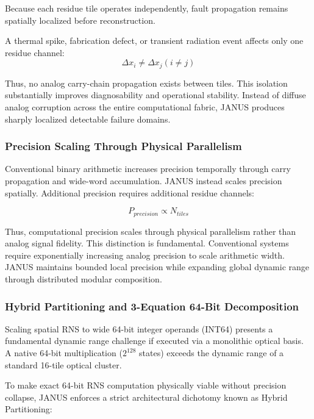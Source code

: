 \documentclass[journal]{IEEEtran}
\begin{document}
Because each residue tile operates independently, fault propagation remains spatially localized before reconstruction.

A thermal spike, fabrication defect, or transient radiation event affects only one residue channel:
\begin{equation}
\Delta x_i \neq  \Delta x_j (i \neq  j)
\end{equation}

Thus, no analog carry-chain propagation exists between tiles. This isolation substantially improves diagnosability and operational stability. Instead of diffuse analog corruption across the entire computational fabric, JANUS produces sharply localized detectable failure domains.

\subsubsection{\textbf{Precision Scaling Through Physical Parallelism}}

Conventional binary arithmetic increases precision temporally through carry propagation and wide-word accumulation. JANUS instead scales precision spatially. Additional precision requires additional residue channels:

\begin{equation}
P_{precision} \propto N_{tiles}
\end{equation}

Thus, computational precision scales through physical parallelism rather than analog signal fidelity. This distinction is fundamental. Conventional systems require exponentially increasing analog precision to scale arithmetic width. JANUS maintains bounded local precision while expanding global dynamic range through distributed modular composition.

\subsubsection{\textbf{Hybrid Partitioning and 3-Equation 64-Bit Decomposition}}

Scaling spatial RNS to wide 64-bit integer operands (INT64) presents a fundamental dynamic range challenge if executed via a monolithic optical basis. A native 64-bit multiplication ($2^{128}$ states) exceeds the dynamic range of a standard 16-tile optical cluster.

To make exact 64-bit RNS computation physically viable without precision collapse, JANUS enforces a strict architectural dichotomy known as Hybrid Partitioning:
\end{document}
